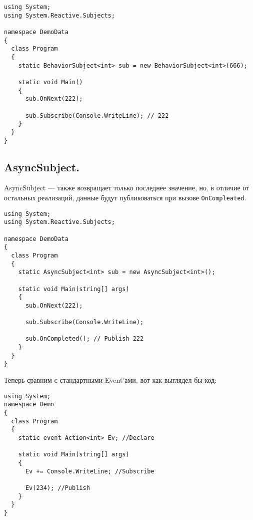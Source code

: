\begin{lstlisting}[style=csharpinlinestyle, caption={Пример использования BehaviorSubject}, label=lst:practice:reactive_extensions:behavior_subject_example]
using System;
using System.Reactive.Subjects;

namespace DemoData
{
  class Program
  {
    static BehaviorSubject<int> sub = new BehaviorSubject<int>(666);

    static void Main()
    {
      sub.OnNext(222);

      sub.Subscribe(Console.WriteLine); // 222
    }
  }
}
\end{lstlisting}

\subsection{AsyncSubject. }
\label{subsub:practice:reactive_extensions:async_subject}

AsyncSubject --- также возвращает только последнее значение, но, в отличие от остальных реализаций, данные будут публиковаться при вызове \lstinline[style=csharpinlinestyle]!OnCompleated!.

\begin{lstlisting}[style=csharpinlinestyle, caption={Пример использования AsyncSubject}, label=lst:practice:reactive_extensions:async_subject_example]
using System;
using System.Reactive.Subjects;

namespace DemoData
{
  class Program
  {
    static AsyncSubject<int> sub = new AsyncSubject<int>();

    static void Main(string[] args)
    {
      sub.OnNext(222);

      sub.Subscribe(Console.WriteLine);

      sub.OnCompleted(); // Publish 222
    }
  }
}
\end{lstlisting}

Теперь сравним с стандартными Event’ами, вот как выглядел бы код:

\begin{lstlisting}[style=csharpinlinestyle, caption={Стандартная модель Event}, label=lst:practice:reactive_extensions:event_example]
using System;
namespace Demo
{
  class Program
  {
    static event Action<int> Ev; //Declare

    static void Main(string[] args)
    {
      Ev += Console.WriteLine; //Subscribe

      Ev(234); //Publish
    }
  }
}
\end{lstlisting}

